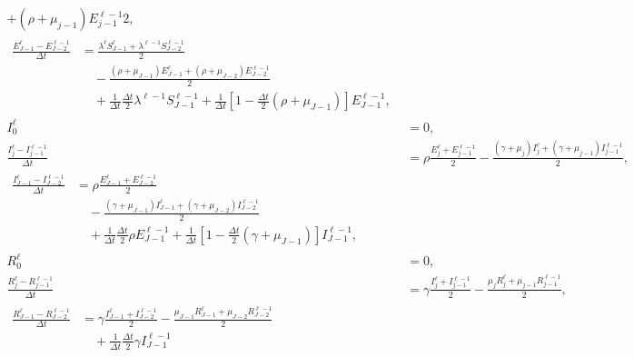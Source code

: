 \documentclass{jpmarticle}
\let\subequationsorig\subequations%
\let\endsubequationsorig\endsubequations%
\renewenvironment{subequations}{
  \subequationsorig
  \renewcommand{\theequation}{\theparentequation.\arabic{equation}}
}{
  \endsubequationsorig
}
\begin{document}
\begin{subequations}
\begin{align}
{      + (\rho + \mu_{j - 1}) E_{j - 1}^{\ell - 1}}{2},
    \\
    \begin{split}
      \frac{E_{J - 1}^{\ell} - E_{J - 2}^{\ell - 1}}{\Delta t} &=
      \frac{\lambda^{\ell} S_{J - 1}^{\ell}
        + \lambda^{\ell - 1} S_{J - 2}^{\ell - 1}}{2}
      \\ & \quad {}
      - \frac{(\rho + \mu_{J - 1}) E_{J - 1}^{\ell}
        + (\rho + \mu_{J - 2}) E_{J - 2}^{\ell - 1}}{2}
      \\ & \quad {}
      + \frac{1}{\Delta t} \frac{\Delta t}{2}
      \lambda^{\ell - 1} S_{J - 1}^{\ell - 1}
      + \frac{1}{\Delta t} \left[
        1 - \frac{\Delta t}{2} (\rho + \mu_{J - 1})
      \right] E_{J - 1}^{\ell - 1},
    \end{split}
    \\
    I_0^{\ell} &= 0,
    \\
    \frac{I_j^{\ell} - I_{j - 1}^{\ell - 1}}{\Delta t} &=
    \rho \frac{E_j^{\ell} + E_{j - 1}^{\ell - 1}}{2}
    - \frac{(\gamma + \mu_j) I_j^{\ell}
      + (\gamma + \mu_{j - 1}) I_{j - 1}^{\ell - 1}}{2},
    \\
    \begin{split}
      \frac{I_{J - 1}^{\ell} - I_{J - 2}^{\ell - 1}}{\Delta t} &=
      \rho \frac{E_{J - 1}^{\ell} + E_{J - 2}^{\ell - 1}}{2}
      \\ & \quad {}
      - \frac{(\gamma + \mu_{J - 1}) I_{J - 1}^{\ell}
        + (\gamma + \mu_{J - 2}) I_{J - 2}^{\ell - 1}}{2}
      \\ & \quad {}
      + \frac{1}{\Delta t} \frac{\Delta t}{2}
      \rho E_{J - 1}^{\ell - 1}
      + \frac{1}{\Delta t} \left[
        1 - \frac{\Delta t}{2} (\gamma + \mu_{J - 1})
      \right] I_{J - 1}^{\ell - 1},
    \end{split}
    \\
    R_0^{\ell} &= 0,
    \\
    \frac{R_j^{\ell} - R_{j - 1}^{\ell - 1}}{\Delta t} &=
    \gamma \frac{I_j^{\ell} + I_{j - 1}^{\ell - 1}}{2}
    - \frac{\mu_j R_j^{\ell} + \mu_{j - 1} R_{j - 1}^{\ell - 1}}{2},
    \\
    \begin{split}
      \frac{R_{J - 1}^{\ell} - R_{J - 2}^{\ell - 1}}{\Delta t} &=
      \gamma \frac{I_{J - 1}^{\ell} + I_{J - 2}^{\ell - 1}}{2}
      - \frac{\mu_{J - 1} R_{J - 1}^{\ell}
        + \mu_{J - 2} R_{J - 2}^{\ell - 1}}{2}
      \\ & \quad {}
      + \frac{1}{\Delta t} \frac{\Delta t}{2}
      \gamma I_{J - 1}^{\ell - 1}

\end{split}
\end{align}
\end{subequations}
\end{document}
